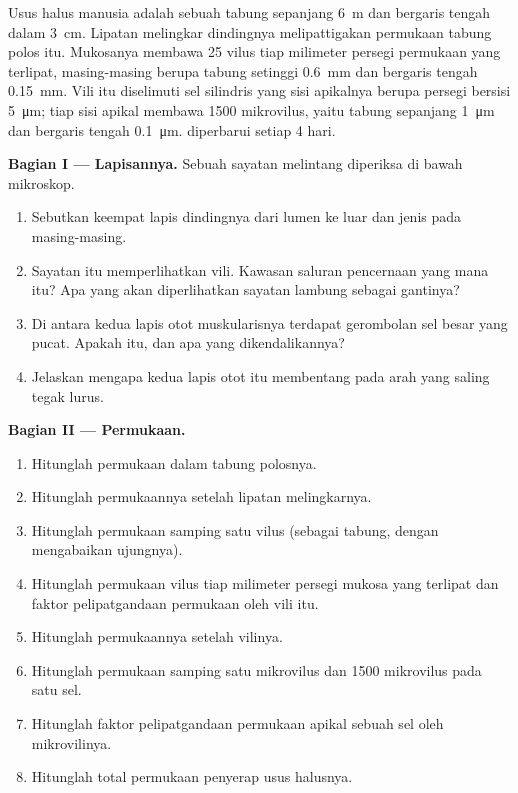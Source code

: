 \begin{problem}
\label{pb:b1:body-plans-tissues:1}
Usus halus manusia adalah sebuah tabung sepanjang \qty{6}{m} dan
bergaris tengah dalam \qty{3}{cm}. Lipatan melingkar dindingnya
melipattigakan permukaan tabung polos itu. Mukosanya membawa
\qty{25}{} vilus tiap milimeter persegi permukaan yang terlipat,
masing-masing berupa tabung setinggi \qty{0.6}{mm} dan bergaris tengah
\qty{0.15}{mm}. Vili itu diselimuti sel silindris yang sisi apikalnya
berupa persegi bersisi \qty{5}{\micro m}; tiap sisi apikal membawa
\qty{1500}{} mikrovilus, yaitu tabung sepanjang \qty{1}{\micro m} dan
bergaris tengah \qty{0.1}{\micro m}.  diperbarui setiap
\qty{4}{} hari.

\medskip
\noindent\textbf{Bagian I --- Lapisannya.}
Sebuah sayatan melintang diperiksa di bawah mikroskop.
\begin{enumerate}
  \item Sebutkan keempat lapis dindingnya dari lumen ke luar dan jenis
         pada masing-masing.
  \item Sayatan itu memperlihatkan vili. Kawasan saluran pencernaan
        yang mana itu? Apa yang akan diperlihatkan sayatan lambung
        sebagai gantinya?
  \item Di antara kedua lapis otot muskularisnya terdapat gerombolan
        sel besar yang pucat. Apakah itu, dan apa yang dikendalikannya?
  \item Jelaskan mengapa kedua lapis otot itu membentang pada arah yang
        saling tegak lurus.
\end{enumerate}

\medskip
\noindent\textbf{Bagian II --- Permukaan.}
\begin{enumerate}[resume]
  \item Hitunglah permukaan dalam tabung polosnya.
  \item Hitunglah permukaannya setelah lipatan melingkarnya.
  \item Hitunglah permukaan samping satu vilus (sebagai tabung, dengan
        mengabaikan ujungnya).
  \item Hitunglah permukaan vilus tiap milimeter persegi mukosa yang
        terlipat dan faktor pelipatgandaan permukaan oleh vili itu.
  \item Hitunglah permukaannya setelah vilinya.
  \item Hitunglah permukaan samping satu mikrovilus dan \qty{1500}{}
        mikrovilus pada satu sel.
  \item Hitunglah faktor pelipatgandaan permukaan apikal sebuah sel
        oleh mikrovilinya.
  \item Hitunglah total permukaan penyerap usus halusnya.
\end{enumerate}


\end{problem}
